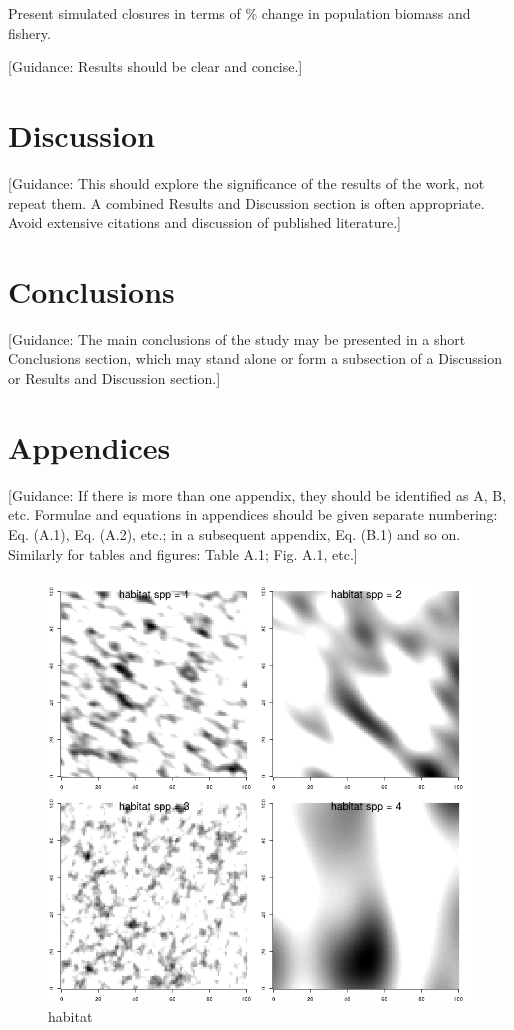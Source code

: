\documentclass[review]{elsarticle}
\begin{document}
Present simulated closures in terms of \% change in population biomass and
fishery.

[Guidance: Results should be clear and concise.]

\section{Discussion}

[Guidance: This should explore the significance of the results of the work, not
repeat them. A combined Results and Discussion section is often appropriate.
Avoid extensive citations and discussion of published literature.]

\section{Conclusions}

[Guidance: The main conclusions of the study may be presented in a short Conclusions
section, which may stand alone or form a subsection of a Discussion or Results
and Discussion section.]

\section*{Appendices}

[Guidance: If there is more than one appendix, they should be identified as A, B, etc.
Formulae and equations in appendices should be given separate numbering: Eq.
(A.1), Eq. (A.2), etc.; in a subsequent appendix, Eq. (B.1) and so on.
Similarly for tables and figures: Table A.1; Fig. A.1, etc.]

\begin{figure}[!ht]
	\includegraphics[width = \linewidth]{../tests/plots/habitat}
		\caption{habitat}
\end{figure}	
\end{document}
